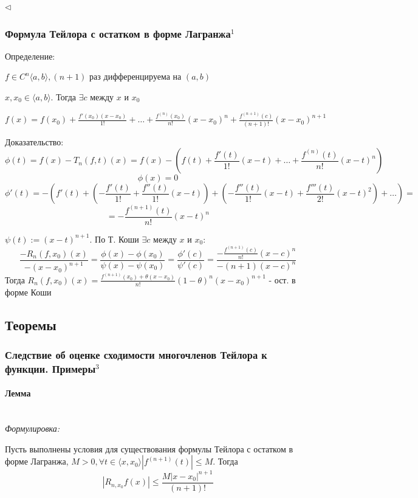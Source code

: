\documentclass{article}
\let\vanillaparagraph\paragraph
\renewcommand{\paragraph}[1]{\vanillaparagraph{#1}\mbox{}\\}
\begin{document}
$\lhd$

\subsubsection{Формула Тейлора с остатком в форме Лагранжа\texorpdfstring{$^1$}{}}
Определение:

$f \in C^n\langle a, b\rangle, (n+1)$ раз дифференцируема на $(a, b)$

$x, x_0 \in \langle a, b\rangle$. Тогда $\exists c$ между $x$ и $x_0$

$f(x) = f(x_0) + \frac{f'(x_0)(x-x_0)}{1!} + \ldots + \frac{f^{(n)} (x_0)}{n!} (x-x_0)^n + \frac{f^{(n+1)} (c)}{(n+1)!}(x-x_0)^{n+1}$

Доказательство:
$$
\phi(t) = f (x) - T_n(f, t)(x) = f(x) - \left(f(t) + \frac{f'(t)}{1!}(x-t) + \ldots + \frac{f^{(n)}(t)}{n!}(x-t)^n\right)
$$
$$
\phi(x) = 0 
$$
$$
\phi'(t) = -\left(f'(t)+\left(-\frac{f'(t)}{1!}+\frac{f''(t)}{1!}(x-t)\right)+\left(-\frac{f''(t)}{1!}(x-t)+\frac{f'''(t)}{2!}(x-t)^2\right) + \ldots\right) =
$$
$$
=-\frac{f^{(n+1)}(t)}{n!}(x-t)^n
$$

$\psi(t) := (x-t)^{n+1}$. По Т. Коши $\exists c$ между $x$ и $x_0:$
$$
\frac{-R_n(f, x_0)(x)}{-(x-x_0)^{n+1}} = \frac{\phi(x)-\phi(x_0)}{\psi(x)-\psi(x_0)} = \frac{\phi'(c)}{\psi'(c)} = \frac{-\frac{f^{(n+1)} (c) }{n!} (x-c)^n}{-(n+1)(x-c)^n}
$$
Тогда $R_n(f, x_0)(x) = \frac{f^{(n+1)}(x_0)+\theta(x-x_0)}{n!} (1-\theta)^n(x-x_0)^{n+1}$ - ост. в форме Коши

\newpage

\subsection{Теоремы}

\subsubsection{Следствие об оценке сходимости многочленов Тейлора к функции. Примеры\texorpdfstring{$^3$}{}}
\paragraph{Лемма}

\textit{Формулировка: }

Пусть выполнены условия для существования формулы Тейлора с остатком в форме Лагранжа, $M > 0, \forall t\in \langle x, x_0\rangle|f^{(n+1)}(t)| \leq M$. Тогда 
\begin{equation} \label{eq_a}
|R_{n, x_0} f(x)| \leq \frac{M|x - x_0|^{n+1}} {(n+1)!} 
\end{equation}
\end{document}
